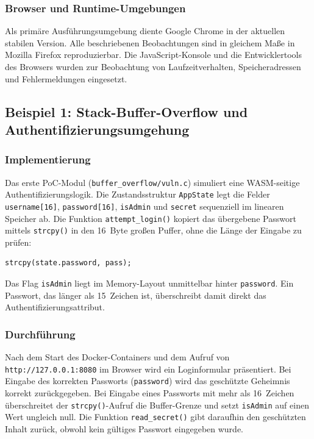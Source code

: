 \subsubsection{Browser und Runtime-Umgebungen}

Als primäre Ausführungsumgebung diente Google Chrome in der aktuellen stabilen Version. Alle beschriebenen Beobachtungen sind in gleichem Maße in Mozilla Firefox reproduzierbar. Die JavaScript-Konsole und die Entwicklertools des Browsers wurden zur Beobachtung von Laufzeitverhalten, Speicheradressen und Fehlermeldungen eingesetzt.

\subsection{Beispiel 1: Stack-Buffer-Overflow und Authentifizierungsumgehung}

\subsubsection{Implementierung}

Das erste PoC-Modul (\texttt{buffer\_overflow/vuln.c}) simuliert eine WASM-seitige Authentifizierungslogik. Die Zustandsstruktur \texttt{AppState} legt die Felder \texttt{username[16]}, \texttt{password[16]}, \texttt{isAdmin} und \texttt{secret} sequenziell im linearen Speicher ab. Die Funktion \texttt{attempt\_login()} kopiert das übergebene Passwort mittels \texttt{strcpy()} in den 16~Byte großen Puffer, ohne die Länge der Eingabe zu prüfen:

\begin{verbatim}
strcpy(state.password, pass);
\end{verbatim}

Das Flag \texttt{isAdmin} liegt im Memory-Layout unmittelbar hinter \texttt{password}. Ein Passwort, das länger als 15~Zeichen ist, überschreibt damit direkt das Authentifizierungsattribut.

\subsubsection{Durchführung}

Nach dem Start des Docker-Containers und dem Aufruf von \texttt{http://127.0.0.1:8080} im Browser wird ein Loginformular präsentiert. Bei Eingabe des korrekten Passworts (\texttt{password}) wird das geschützte Geheimnis korrekt zurückgegeben. Bei Eingabe eines Passworts mit mehr als 16~Zeichen überschreitet der \texttt{strcpy()}-Aufruf die Buffer-Grenze und setzt \texttt{isAdmin} auf einen Wert ungleich null. Die Funktion \texttt{read\_secret()} gibt daraufhin den geschützten Inhalt zurück, obwohl kein gültiges Passwort eingegeben wurde.

